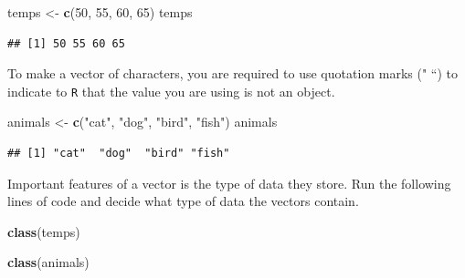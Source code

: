 \documentclass[]{article}
\newenvironment{Shaded}{\begin{snugshade}}{\end{snugshade}}
\newcommand{\KeywordTok}[1]{\textcolor[rgb]{0.13,0.29,0.53}{\textbf{#1}}}
\newcommand{\DecValTok}[1]{\textcolor[rgb]{0.00,0.00,0.81}{#1}}
\newcommand{\StringTok}[1]{\textcolor[rgb]{0.31,0.60,0.02}{#1}}
\newcommand{\NormalTok}[1]{#1}
\begin{document}
\vspace{0.25cm}

\begin{Shaded}
\begin{Highlighting}[]
\NormalTok{temps <-}\StringTok{ }\KeywordTok{c}\NormalTok{(}\DecValTok{50}\NormalTok{, }\DecValTok{55}\NormalTok{, }\DecValTok{60}\NormalTok{, }\DecValTok{65}\NormalTok{)}
\NormalTok{temps}
\end{Highlighting}
\end{Shaded}

\begin{verbatim}
## [1] 50 55 60 65
\end{verbatim}

\vspace{0.25cm}

To make a vector of characters, you are required to use quotation marks
(" ``) to indicate to \texttt{R} that the value you are using is not an
object.

\vspace{0.25cm}

\begin{Shaded}
\begin{Highlighting}[]
\NormalTok{animals <-}\StringTok{ }\KeywordTok{c}\NormalTok{(}\StringTok{"cat"}\NormalTok{, }\StringTok{"dog"}\NormalTok{, }\StringTok{"bird"}\NormalTok{, }\StringTok{"fish"}\NormalTok{)}
\NormalTok{animals}
\end{Highlighting}
\end{Shaded}

\begin{verbatim}
## [1] "cat"  "dog"  "bird" "fish"
\end{verbatim}

\vspace{0.25cm}

Important features of a vector is the type of data they store. Run the
following lines of code and decide what type of data the vectors
contain.

\vspace{0.25cm}

\begin{Shaded}
\begin{Highlighting}[]
\KeywordTok{class}\NormalTok{(temps)}

\KeywordTok{class}\NormalTok{(animals)}
\end{Highlighting}
\end{Shaded}

\vspace{0.25cm}
\end{document}

